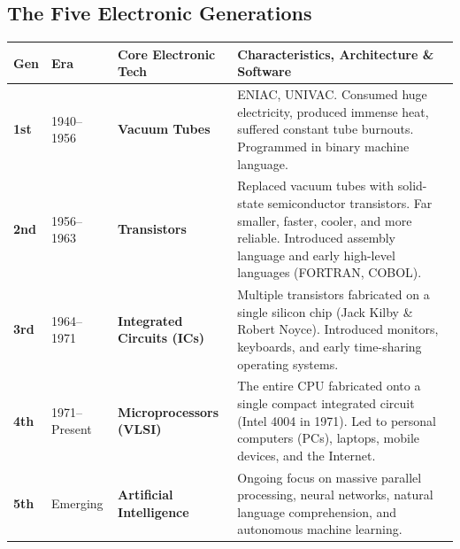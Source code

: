 \subsection{The Five Electronic Generations}
\begin{center}
\small
\renewcommand{\arraystretch}{1.3}
\begin{tabularx}{\textwidth}{l l l X}
\toprule
\textbf{Gen} & \textbf{Era} & \textbf{Core Electronic Tech} & \textbf{Characteristics, Architecture \& Software} \\
\midrule
\textbf{1st} & 1940--1956 & \textbf{Vacuum Tubes} & ENIAC, UNIVAC. Consumed huge electricity, produced immense heat, suffered constant tube burnouts. Programmed in binary machine language. \\
\textbf{2nd} & 1956--1963 & \textbf{Transistors} & Replaced vacuum tubes with solid-state semiconductor transistors. Far smaller, faster, cooler, and more reliable. Introduced assembly language and early high-level languages (FORTRAN, COBOL). \\
\textbf{3rd} & 1964--1971 & \textbf{Integrated Circuits (ICs)} & Multiple transistors fabricated on a single silicon chip (Jack Kilby \& Robert Noyce). Introduced monitors, keyboards, and early time-sharing operating systems. \\
\textbf{4th} & 1971--Present & \textbf{Microprocessors (VLSI)} & The entire CPU fabricated onto a single compact integrated circuit (Intel 4004 in 1971). Led to personal computers (PCs), laptops, mobile devices, and the Internet. \\
\textbf{5th} & Emerging & \textbf{Artificial Intelligence} & Ongoing focus on massive parallel processing, neural networks, natural language comprehension, and autonomous machine learning. \\
\bottomrule
\end{tabularx}
\end{center}


